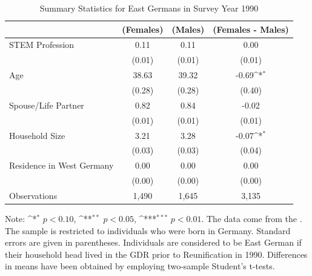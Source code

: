 \documentclass[a4paper, oneside, hyperfootnotes = false]{article}
\def\sym#1{\ifmmode^{#1}\else\(^{#1}\)\fi}
\begin{document}
{\begin{table}[ht]
	\caption{Summary Statistics for East Germans in Survey Year 1990}
	\label{tab:descr_summary_east}
	\begin{center}
		\begin{tabular}{l*{3}{c}}
			\toprule
			& (Females) & (Males) & (Females - Males) \\
			\midrule
			STEM Profession & 0.11  & 0.11  &   0.00     \\
			&   (0.01)  & (0.01) & (0.01) \\
			\addlinespace
			Age         &   38.63   &  39.32  &  -0.69\sym{*}     \\
			&     (0.28) &        (0.28)         &      (0.40) \\
			\addlinespace
			Spouse/Life Partner &  0.82      &  0.84  &    -0.02    \\
			&      (0.01)&          (0.01)&         (0.01) \\
			\addlinespace
			Household Size      &  3.21   &  3.28   &   -0.07\sym{*}       \\
			&          (0.03)&       (0.03)        &      (0.04)\\
			\addlinespace
			Residence in West Germany&  0.00   &   0.00  &  0.00         \\
			&         (0.00) &       (0.00)&  (0.00)\\
			\midrule
			Observations        &  1,490    &    1,645     &      3,135             \\
			\bottomrule
		\end{tabular}
		
		\vspace{2mm}
		
		\parbox{10cm}{
			\linespread{1}\footnotesize Note: \sym{*} \(p<0.10\), \sym{**} \(p<0.05\), \sym{***} \(p<0.01\). The data come from the \cite{SOEP2023}. The sample is restricted to individuals who were born in Germany. Standard errors are given in parentheses. Individuals are considered to be East German if their household head lived in the GDR prior to Reunification in 1990. Differences in means have been obtained by employing two-sample Student's t-tests.}
		
	\end{center}
\end{table}

}
\end{document}
